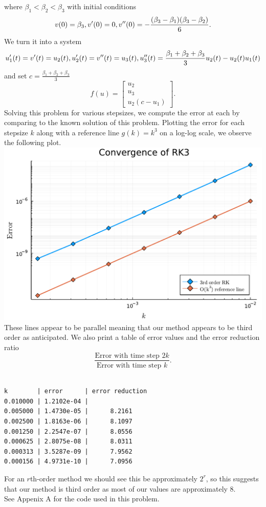 \documentclass{article}
\begin{document}
where $\beta_1 < \beta_2 < \beta_3$ with initial conditions
$$
v(0) = \beta_3, \\
v'(0) = 0,\\
v''(0) = -\frac{(\beta_3 - \beta_1)(\beta_3-\beta_2)}{6}.$$ We turn it into a system
$$
u_1'(t) =  v'(t) = u_2(t),\\
u_2'(t) = v''(t) = u_3(t),\\
u_3''(t) = \frac{\beta_1 + \beta_2 + \beta_3}{3} u_2(t) -  u_2(t)u_1(t)
$$
and set $c = \frac{\beta_1 + \beta_2 + \beta_3}{3}$
$$
f(u) = \begin{bmatrix} u_2 \\ u_3 \\ u_2(c - u_1)\end{bmatrix}.
$$
Solving this problem for various stepsizes, we compute the error at each by comparing to the known solution of this problem. Plotting the error for each stepsize $k$ along with a reference line $g(k)=k^3$ on a log-log scale, we observe the following plot. \\
\includegraphics[scale=0.5]{p1.pdf}\\
These lines appear to be parallel meaning that our method appears to be third order as anticipated. We also print a table of error values and the error reduction ratio $$\frac{\text{Error with time step } 2k}{\text{Error with time step } k}.$$\\
\begin{verbatim}
k        | error      | error reduction   
0.010000 | 1.2102e-04 |       
0.005000 | 1.4730e-05 |      8.2161  
0.002500 | 1.8163e-06 |      8.1097  
0.001250 | 2.2547e-07 |      8.0556  
0.000625 | 2.8075e-08 |      8.0311  
0.000313 | 3.5287e-09 |      7.9562  
0.000156 | 4.9731e-10 |      7.0956
\end{verbatim}
For an $r$th-order method we should see this be approximately $2^r$, so this suggests that our method is third order as most of our values are approximately 8. \\
See Appenix A for the code used in this problem.
\end{document}
